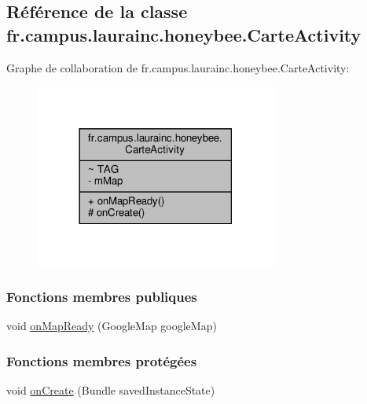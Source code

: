 \hypertarget{classfr_1_1campus_1_1laurainc_1_1honeybee_1_1_carte_activity}{}\subsection{Référence de la classe fr.\+campus.\+laurainc.\+honeybee.\+Carte\+Activity}
\label{classfr_1_1campus_1_1laurainc_1_1honeybee_1_1_carte_activity}


Graphe de collaboration de fr.\+campus.\+laurainc.\+honeybee.\+Carte\+Activity\+:\nopagebreak
\begin{figure}[H]
\begin{center}
\leavevmode
\includegraphics[width=225pt]{classfr_1_1campus_1_1laurainc_1_1honeybee_1_1_carte_activity__coll__graph}
\end{center}
\end{figure}
\subsubsection*{Fonctions membres publiques}
\begin{DoxyCompactItemize}
\item 
void \hyperlink{classfr_1_1campus_1_1laurainc_1_1honeybee_1_1_carte_activity_a30d970c7028be9de18778dbb19e65196}{on\+Map\+Ready} (Google\+Map google\+Map)
\end{DoxyCompactItemize}
\subsubsection*{Fonctions membres protégées}
\begin{DoxyCompactItemize}
\item 
void \hyperlink{classfr_1_1campus_1_1laurainc_1_1honeybee_1_1_carte_activity_a6e10bf7de1bf581b5118fa6de2ac465e}{on\+Create} (Bundle saved\+Instance\+State)
\end{DoxyCompactItemize}
